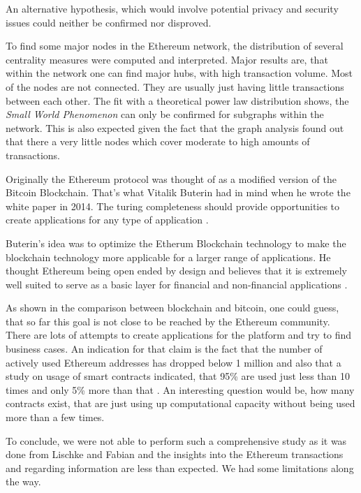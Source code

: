 An alternative hypothesis, which would involve potential privacy and security issues could neither be confirmed nor disproved.

To find some major nodes in the Ethereum network, the distribution of several centrality measures were computed and interpreted. 
Major results are, that within the network one can find major hubs, with high transaction volume. Most of the nodes are not connected. 
They are usually just having little transactions between each other. 
The fit with a theoretical power law distribution shows, the \emph{Small World Phenomenon} can only be confirmed for subgraphs within the network.
This is also expected given the fact that the graph analysis found out that there a very little nodes which cover moderate to high amounts of transactions.

Originally the Ethereum protocol was thought of as a modified version of the Bitcoin Blockchain. 
That's what Vitalik Buterin had in mind when he wrote the white paper in 2014. 
The turing completeness should provide opportunities to create applications for any type of application \cite{vitalikwhite}.

Buterin's idea was to optimize the Etherum Blockchain technology to make the blockchain technology more applicable for a larger range of applications. 
He thought Ethereum being open ended by design and believes that it is extremely well suited to serve as a basic layer for financial and non-financial applications \cite{vitalikwhite}.

As shown in the comparison between blockchain and bitcoin, one could guess, that so far this goal is not close to be reached by the Ethereum community. 
There are lots of attempts to create applications for the platform and try to find business cases. 
An indication for that claim is the fact that the number of actively used Ethereum addresses has dropped below 1 million and also that a study on usage of smart contracts indicated, that 95\% are used just less than 10 times and only 5\% more than that \cite{Chandersekhar2018}.
An interesting question would be, how many contracts exist, that are just using up computational capacity without being used more than a few times.

To conclude, we were not able to perform such a comprehensive study as it was done from Lischke and Fabian and the insights into the Ethereum transactions and regarding information are less than expected. 
We had some limitations along the way.

